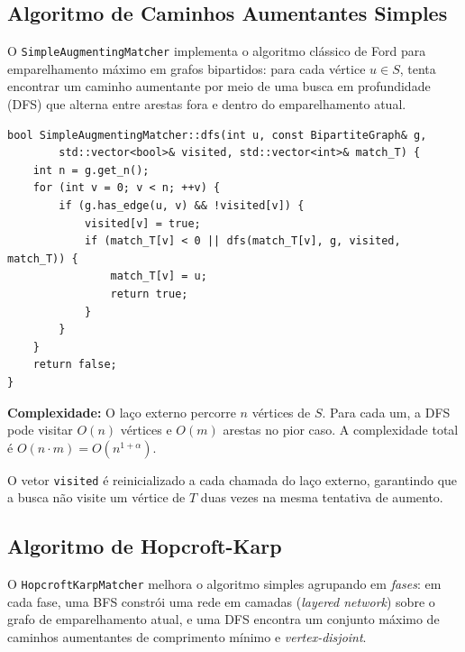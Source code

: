\documentclass{infufrgs}
\begin{document}
\subsection{Algoritmo de Caminhos Aumentantes Simples}

O \texttt{SimpleAugmentingMatcher} implementa o algoritmo clássico de Ford para emparelhamento máximo em grafos bipartidos: para cada vértice $u \in S$, tenta encontrar um caminho aumentante por meio de uma busca em profundidade (DFS) que alterna entre arestas fora e dentro do emparelhamento atual.

\begin{lstlisting}[caption={Núcleo da DFS em SimpleAugmentingMatcher.cpp}]
bool SimpleAugmentingMatcher::dfs(int u, const BipartiteGraph& g,
        std::vector<bool>& visited, std::vector<int>& match_T) {
    int n = g.get_n();
    for (int v = 0; v < n; ++v) {
        if (g.has_edge(u, v) && !visited[v]) {
            visited[v] = true;
            if (match_T[v] < 0 || dfs(match_T[v], g, visited, match_T)) {
                match_T[v] = u;
                return true;
            }
        }
    }
    return false;
}
\end{lstlisting}

\textbf{Complexidade:} O laço externo percorre $n$ vértices de $S$. Para cada um, a DFS pode visitar $O(n)$ vértices e $O(m)$ arestas no pior caso. A complexidade total é $O(n \cdot m) = O(n^{1+\alpha})$.

O vetor \texttt{visited} é reinicializado a cada chamada do laço externo, garantindo que a busca não visite um vértice de $T$ duas vezes na mesma tentativa de aumento.

\subsection{Algoritmo de Hopcroft-Karp}

O \texttt{HopcroftKarpMatcher} melhora o algoritmo simples agrupando em \emph{fases}: em cada fase, uma BFS constrói uma rede em camadas (\emph{layered network}) sobre o grafo de emparelhamento atual, e uma DFS encontra um conjunto máximo de caminhos aumentantes de comprimento mínimo e \emph{vertex-disjoint}.
\end{document}
